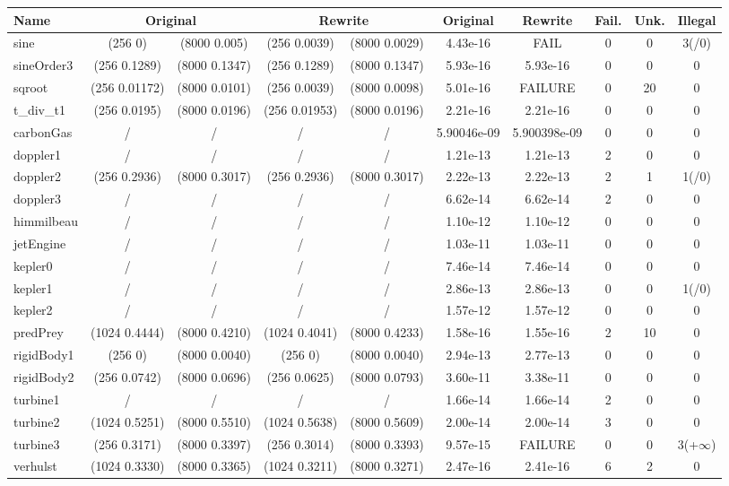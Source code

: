 \documentclass[runningheads]{llncs}
\begin{document}
\begin{table}[h]
\begin{adjustbox}{center}
\begin{tabular}{l|c|c|c|c|c|c|c|c|c|}
		\cmidrule{2-5}\cmidrule{5-6}\cmidrule{6-10}
		Name     & \multicolumn{2}{|c|}{Original}   & \multicolumn{2}{|c|}{Rewrite}  & Original & Rewrite & Fail. & Unk. &Illegal \\
		\midrule
		sine &(256 0) & (8000 0.005) &(256 0.0039) & (8000 0.0029)&4.43e-16& FAIL& 0& 0& 3(/0)\\
		sineOrder3 &(256 0.1289) & (8000 0.1347)&(256 0.1289) &(8000 0.1347)& 5.93e-16& 5.93e-16& 0& 0& 0\\
		sqroot&(256 0.01172)& (8000 0.0101)&(256 0.0039) &(8000 0.0098) & 5.01e-16& FAILURE& 0& 20& 0\\
		t\_div\_t1 &(256 0.0195)& (8000 0.0196)&(256 0.01953)& (8000 0.0196)& 2.21e-16 & 2.21e-16 & 0& 0& 0\\
		carbonGas &/&/&/&/& 5.90046e-09 & 5.900398e-09& 0& 0& 0\\
		doppler1 &/&/&/&/& 1.21e-13 & 1.21e-13& 2& 0& 0\\
		doppler2 &(256 0.2936) &(8000 0.3017)&(256 0.2936) &(8000 0.3017)& 2.22e-13 & 2.22e-13 & 2& 1& 1(/0)\\
		doppler3 &/&/&/&/& 6.62e-14 & 6.62e-14 & 2& 0& 0\\
		himmilbeau &/&/&/&/& 1.10e-12 & 1.10e-12 & 0& 0& 0\\
		jetEngine &/&/&/&/& 1.03e-11 & 1.03e-11 & 0& 0& 0\\
		kepler0 &/&/&/&/& 7.46e-14 & 7.46e-14 & 0& 0& 0\\
		kepler1 &/&/&/&/& 2.86e-13 & 2.86e-13 & 0& 0& 1(/0)\\
		kepler2 &/&/&/&/& 1.57e-12 & 1.57e-12 & 0& 0& 0\\
		predPrey &(1024 0.4444) &(8000 0.4210)&(1024 0.4041)& (8000 0.4233)& 1.58e-16 & 1.55e-16 & 2& 10& 0\\
		rigidBody1 &(256 0) &(8000 0.0040)&(256 0) &(8000 0.0040)& 2.94e-13 & 2.77e-13 & 0& 0& 0\\
		rigidBody2 &(256 0.0742) &(8000 0.0696)&(256 0.0625) &(8000 0.0793)& 3.60e-11 & 3.38e-11 & 0& 0& 0\\
		turbine1 &/&/&/&/& 1.66e-14 & 1.66e-14 & 2& 0& 0\\
		turbine2 &(1024 0.5251)& (8000 0.5510)&(1024 0.5638) &(8000 0.5609)& 2.00e-14 & 2.00e-14 & 3& 0& 0\\
		turbine3 &(256 0.3171) &(8000 0.3397)&(256 0.3014) &(8000 0.3393)& 9.57e-15& FAILURE& 0& 0& 3(+$\infty$)\\
		verhulst &(1024 0.3330) &(8000 0.3365)&(1024 0.3211) &(8000 0.3271)& 2.47e-16 & 2.41e-16 & 6& 2& 0\\

\end{tabular}
\end{adjustbox}
\end{table}
\end{document}
